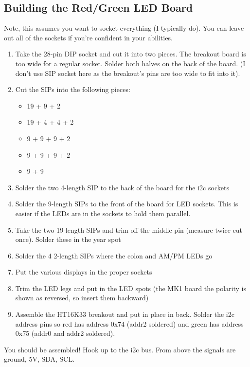 \documentclass[11pt]{article}
\begin{document}

\subsection{Building the Red/Green LED Board}

Note, this assumes you want to socket everything (I typically do).
You can leave out all of the sockets if you're confident in your
abilities.

\begin{enumerate}
\item Take the 28-pin DIP socket and cut it into two pieces.
      The breakout board is too wide for a regular socket.
      Solder both halves on the back of the board.
      (I don't use SIP socket here as the breakout's pins are too
       wide to fit into it).
\item Cut the SIPs into the following pieces:
\begin{itemize}
\item 19 + 9 + 2
\item 19 + 4 + 4 + 2
\item 9 + 9 + 9 + 2
\item 9 + 9 + 9 + 2
\item 9 + 9
\end{itemize}
\item Solder the two 4-length SIP to the back of the board
      for the i2c sockets
\item Solder the 9-length SIPs to the front of the board for LED
      sockets.  This is easier if the LEDs are in the sockets to
      hold them parallel.
\item Take the two 19-length SIPs and trim off the middle pin
      (measure twice cut once).  Solder these in the year spot
\item Solder the 4 2-length SIPs where the colon and AM/PM LEDs go
\item Put the various displays in the proper sockets
\item Trim the LED legs and put in the LED spots (the MK1 board
      the polarity is shown as reversed, so insert them backward)
\item Assemble the HT16K33 breakout and put in place in back.
	Solder the i2c address pins so red has address 0x74
        (addr2 soldered) and green has address 0x75 (addr0 and addr2
	soldered).
\end{enumerate}

You should be assembled!  Hook up to the i2c bus.  From above
the signals are ground, 5V, SDA, SCL.
\end{document}
